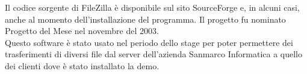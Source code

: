 Il codice sorgente di FileZilla è disponibile sul sito SourceForge e, in alcuni casi, anche al momento dell'installazione del programma. Il progetto fu nominato Progetto del Mese nel novembre del 2003.\\
Questo software è stato usato nel periodo dello stage per poter permettere dei trasferimenti di diversi file dal server dell’azienda Sanmarco Informatica a quello dei clienti dove è stato installato la demo. 

























